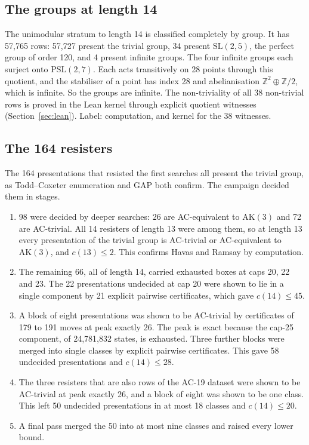 \documentclass[11pt,a4paper]{article}
\theoremstyle{definition}
\newcommand{\AK}{\mathrm{AK}}
\begin{document}
\subsection{The groups at length 14}

The unimodular stratum to length 14 is classified completely by group. It has 57,765 rows: 57,727 present the trivial group, 34 present $\mathrm{SL}(2,5)$, the perfect group of order 120, and 4 present infinite groups. The four infinite groups each surject onto $\mathrm{PSL}(2,7)$. Each acts transitively on 28 points through this quotient, and the stabiliser of a point has index 28 and abelianisation $\mathbb{Z}^2\oplus\mathbb{Z}/2$, which is infinite. So the groups are infinite. The non-triviality of all 38 non-trivial rows is proved in the Lean kernel through explicit quotient witnesses (Section~\ref{sec:lean}). Label: computation, and kernel for the 38 witnesses.

\subsection{The 164 resisters}\label{sec:resisters}

The 164 presentations that resisted the first searches all present the trivial group, as Todd--Coxeter enumeration and GAP both confirm. The campaign decided them in stages.

\begin{enumerate}
\item 98 were decided by deeper searches: 26 are AC-equivalent to $\AK(3)$ and 72 are AC-trivial. All 14 resisters of length 13 were among them, so at length 13 every presentation of the trivial group is AC-trivial or AC-equivalent to $\AK(3)$, and $c(13)\le 2$. This confirms Havas and Ramsay \cite{HR03} by computation.
\item The remaining 66, all of length 14, carried exhausted boxes at caps 20, 22 and 23. The 22 presentations undecided at cap 20 were shown to lie in a single component by 21 explicit pairwise certificates, which gave $c(14)\le 45$.
\item A block of eight presentations was shown to be AC-trivial by certificates of 179 to 191 moves at peak exactly 26. The peak is exact because the cap-25 component, of 24,781,832 states, is exhausted. Three further blocks were merged into single classes by explicit pairwise certificates. This gave 58 undecided presentations and $c(14)\le 28$.
\item The three resisters that are also rows of the AC-19 dataset were shown to be AC-trivial at peak exactly 26, and a block of eight was shown to be one class. This left 50 undecided presentations in at most 18 classes and $c(14)\le 20$.
\item A final pass merged the 50 into at most nine classes and raised every lower bound.
\end{enumerate}
\end{document}
